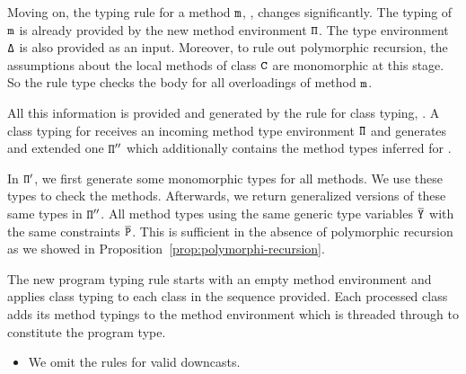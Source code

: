 
Moving on, the typing rule for a method ${\tt m}$, , changes
significantly. The typing of ${\tt m}$ is already provided by the new
method environment ${\tt \Pi}$.  The type environment ${\tt \Delta}$ is
also provided as an input. Moreover, to rule out polymorphic
recursion, the assumptions about the local methods of class ${\tt C}$
are monomorphic at this stage. So the rule type checks the body for
all overloadings of method ${\tt m}$.

All this information is provided and generated by the rule for class
typing, . A class typing for  receives an incoming
method type environment ${\tt \Pi}$ and generates and extended one
${\tt \Pi''}$ which additionally contains the method types inferred for
.

In ${\tt \Pi'}$, we first generate some monomorphic types for all
methods. We use these types to check the methods. Afterwards, we
return generalized versions of these same types in ${\tt \Pi''}$. All
method types using the same generic type variables $\overline{\tt Y}$ with the
same constraints $\overline{\tt P}$. This is sufficient in the absence of
polymorphic recursion as we showed in
Proposition~\ref{prop:polymorphi-recursion}.

The new program typing rule  starts with an empty
method environment and applies class typing to each class in the
sequence provided. Each processed class adds its method typings to the method
environment which is threaded through to constitute the program type. 

\begin{itemize}
\item We omit the rules for valid downcasts.


\end{itemize}


